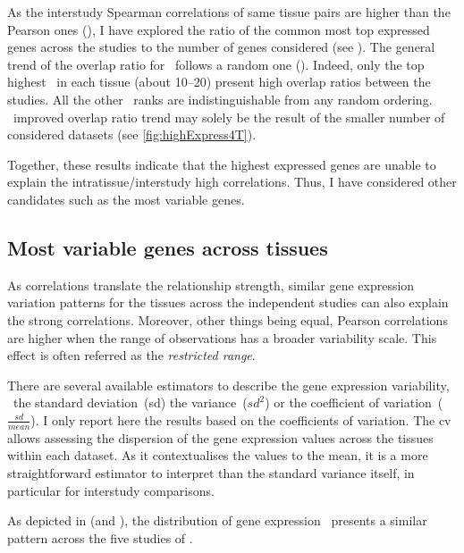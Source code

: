 As the interstudy Spearman correlations of same tissue pairs
are higher than the Pearson ones (),
I have explored the ratio of the common most top expressed
genes across the studies to the number of genes considered
(see ).
The general trend of the overlap ratio for \setOne\ follows a random one
().
Indeed, only the top highest \pcgs\ in each tissue (about 10--20)
present high overlap ratios between the studies.
All the other \pcg\ ranks are indistinguishable from any random ordering.
\setTwo\ improved overlap ratio trend may solely be
the result of the smaller number of considered datasets
(see \cref{fig:highExpress4T}).

Together, these results indicate
that the highest expressed genes are unable to explain
the intratissue/interstudy high correlations.
Thus, I have considered other candidates
such as the most variable genes.


\subsection{Most variable genes across tissues}
As correlations translate the relationship strength,
similar gene expression variation patterns for the tissues
across the independent studies can also explain the strong correlations.
Moreover, other things being equal,
Pearson correlations are higher
when the range of observations has a broader variability scale.
This effect is often referred as
the \emph{restricted range}.~

There are several available estimators to describe the gene expression variability,
\eg\ the standard deviation~(sd) the variance~($sd^2$) or the coefficient of
variation~($\frac{sd}{mean}$).
I only report here the results based on the coefficients of variation.
The \gls{cv} allows assessing
the dispersion of the gene expression values
across the tissues within each dataset.
As it contextualises the values to the mean,
it is a more straightforward estimator to interpret than
the standard variance itself,
in particular for interstudy comparisons.

\begin{comment}
Visualising the \gls{cv} distribution of
gene expression for the working set \setOne\ (see \Cref{fig:HistCV4T})
allows determining whether they are similar across the five transcriptomic studies
or that inferring conclusions requires more cautions.
\end{comment}
As depicted in  (and ),
the distribution of gene expression \cvs\ presents a similar pattern
across the five studies of \setOne.

